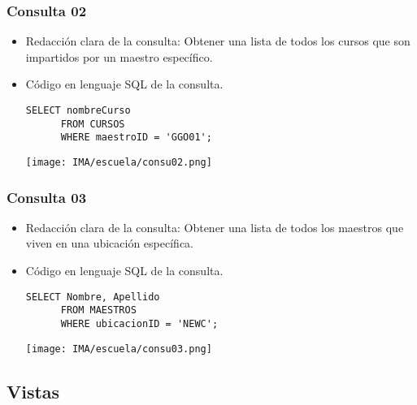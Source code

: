 \subsubsection*{Consulta 02}
\begin{itemize}
    \item Redacción clara de la consulta: Obtener una lista de todos los cursos que son impartidos por un maestro específico.
    \item Código en lenguaje SQL de la consulta.
    
    \begin{lstlisting}[caption={Tablas para la BdDatos}, label={lst:sql_estadios}]
      SELECT nombreCurso
      FROM CURSOS
      WHERE maestroID = 'GGO01';
    \end{lstlisting}    

    \begin{center}
      \texttt{[image: IMA/escuela/consu02.png]}
    \end{center}
    
\end{itemize}


\subsubsection*{Consulta 03}
\begin{itemize}
    \item Redacción clara de la consulta:  Obtener una lista de todos los maestros que viven en una ubicación específica.
    \item Código en lenguaje SQL de la consulta.
    
    \begin{lstlisting}[caption={Tablas para la BdDatos}, label={lst:sql_estadios}]
      SELECT Nombre, Apellido
      FROM MAESTROS
      WHERE ubicacionID = 'NEWC';
    \end{lstlisting}    

    \begin{center}
      \texttt{[image: IMA/escuela/consu03.png]}
    \end{center}

\end{itemize}

\subsection{Vistas}

